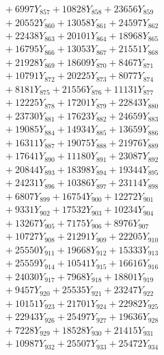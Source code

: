 \documentclass[a4paper,10pt]{article}
\begin{document}
{\begin{align}
&\;  + 6997 Y_{857} + 10828 Y_{858} + 23656 Y_{859} \\[0.3ex]
&\;  + 20552 Y_{860} + 13058 Y_{861} + 24597 Y_{862} \\[0.3ex]
&\;  + 22438 Y_{863} + 20101 Y_{864} + 18968 Y_{865} \\[0.3ex]
&\;  + 16795 Y_{866} + 13053 Y_{867} + 21551 Y_{868} \\[0.5ex]\allowbreak
&\;  + 21928 Y_{869} + 18609 Y_{870} + 8467 Y_{871} \\[0.3ex]
&\;  + 10791 Y_{872} + 20225 Y_{873} + 8077 Y_{874} \\[0.3ex]
&\;  + 8181 Y_{875} + 21556 Y_{876} + 11131 Y_{877} \\[0.3ex]
&\;  + 12225 Y_{878} + 17201 Y_{879} + 22843 Y_{880} \\[0.3ex]
&\;  + 23730 Y_{881} + 17623 Y_{882} + 24659 Y_{883} \\[0.3ex]
&\;  + 19085 Y_{884} + 14934 Y_{885} + 13659 Y_{886} \\[0.3ex]
&\;  + 16311 Y_{887} + 19075 Y_{888} + 21976 Y_{889} \\[0.3ex]
&\;  + 17641 Y_{890} + 11180 Y_{891} + 23087 Y_{892} \\[0.3ex]
&\;  + 20844 Y_{893} + 18398 Y_{894} + 19344 Y_{895} \\[0.3ex]
&\;  + 24231 Y_{896} + 10386 Y_{897} + 23114 Y_{898} \\[0.5ex]\allowbreak
&\;  + 6807 Y_{899} + 16754 Y_{900} + 12272 Y_{901} \\[0.3ex]
&\;  + 9331 Y_{902} + 17532 Y_{903} + 10234 Y_{904} \\[0.3ex]
&\;  + 13267 Y_{905} + 7175 Y_{906} + 8976 Y_{907} \\[0.3ex]
&\;  + 10727 Y_{908} + 21291 Y_{909} + 22205 Y_{910} \\[0.3ex]
&\;  + 25550 Y_{911} + 19668 Y_{912} + 15333 Y_{913} \\[0.3ex]
&\;  + 25559 Y_{914} + 10541 Y_{915} + 16616 Y_{916} \\[0.3ex]
&\;  + 24030 Y_{917} + 7968 Y_{918} + 18801 Y_{919} \\[0.3ex]
&\;  + 9457 Y_{920} + 25535 Y_{921} + 23247 Y_{922} \\[0.3ex]
&\;  + 10151 Y_{923} + 21701 Y_{924} + 22982 Y_{925} \\[0.3ex]
&\;  + 22943 Y_{926} + 25497 Y_{927} + 19636 Y_{928} \\[0.5ex]\allowbreak
&\;  + 7228 Y_{929} + 18528 Y_{930} + 21415 Y_{931} \\[0.3ex]
&\;  + 10987 Y_{932} + 25507 Y_{933} + 25472 Y_{934} \\[0.3ex]

\end{align}}
\end{document}
